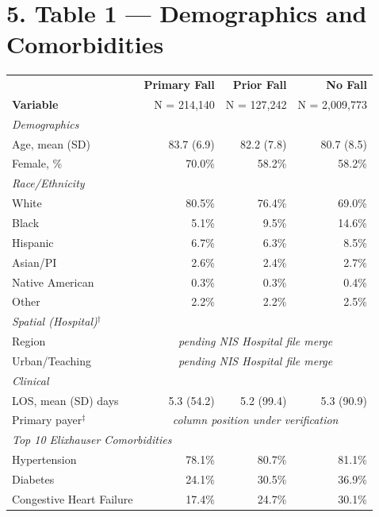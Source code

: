 \documentclass[11pt,letterpaper]{article}
\begin{document}
\section*{5. Table 1 — Demographics and Comorbidities}

\begin{center}
\renewcommand{\arraystretch}{1.2}
\begin{tabular}{lrrr}
\toprule
 & \textbf{Primary Fall} & \textbf{Prior Fall} & \textbf{No Fall} \\
\textbf{Variable} & N = 214,140 & N = 127,242 & N = 2,009,773 \\
\midrule
\multicolumn{4}{l}{\textit{Demographics}} \\
Age, mean (SD)   & 83.7 (6.9) & 82.2 (7.8) & 80.7 (8.5) \\
Female, \%       & 70.0\%     & 58.2\%     & 58.2\% \\
\midrule
\multicolumn{4}{l}{\textit{Race/Ethnicity}} \\
White            & 80.5\% & 76.4\% & 69.0\% \\
Black            & 5.1\%  & 9.5\%  & 14.6\% \\
Hispanic         & 6.7\%  & 6.3\%  & 8.5\% \\
Asian/PI         & 2.6\%  & 2.4\%  & 2.7\% \\
Native American  & 0.3\%  & 0.3\%  & 0.4\% \\
Other            & 2.2\%  & 2.2\%  & 2.5\% \\
\midrule
\multicolumn{4}{l}{\textit{Spatial (Hospital)$^{\dagger}$}} \\
Region           & \multicolumn{3}{c}{\textit{pending NIS Hospital file merge}} \\
Urban/Teaching   & \multicolumn{3}{c}{\textit{pending NIS Hospital file merge}} \\
\midrule
\multicolumn{4}{l}{\textit{Clinical}} \\
LOS, mean (SD) days & 5.3 (54.2) & 5.2 (99.4) & 5.3 (90.9) \\
Primary payer$^{\ddagger}$ & \multicolumn{3}{c}{\textit{column position under verification}} \\
\midrule
\multicolumn{4}{l}{\textit{Top 10 Elixhauser Comorbidities}} \\
Hypertension        & 78.1\% & 80.7\% & 81.1\% \\
Diabetes            & 24.1\% & 30.5\% & 36.9\% \\
Congestive Heart Failure & 17.4\% & 24.7\% & 30.1\% \\

\end{tabular}
\end{center}
\end{document}
